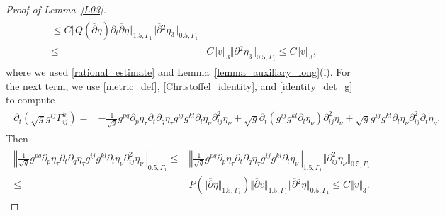 \documentclass[10pt,reqno]{amsart}
\theoremstyle{plain}
\theoremstyle{definition}
\numberwithin{equation}{section}
\newcommand{\ccP}{\mathscr{P}}
\newcommand{\Ga}{\Gamma}
\newcommand{\norm}[1]{\Vert#1\Vert}
\newcommand{\nnorm}[1]{\left\Vert#1\right\Vert}
\begin{document}
{\begin{proof}[Proof of Lemma~\ref{L03}]
\begin{align}
\begin{split}
\leq
C \norm{ Q(\overline{\partial} \eta ) \partial_t \overline{\partial} \eta}_{1.5,\Ga_1} \norm{\overline{\partial}{}^2 \eta_3}_{0.5,\Ga_1} 
\\\leq & 
C\norm{v}_3 \norm{\overline{\partial}{}^2 \eta_3}_{0.5,\Ga_1} 
\leq
C\norm{v}_3 ,
\end{split}
\nonumber
\end{align}
where we used \eqref{rational_estimate}
and Lemma~\ref{lemma_auxiliary_long}(i).
For the next term, we use  \eqref{metric_def}, \eqref{Christoffel_identity}, and  \eqref{identity_det_g} to compute
\begin{align}
\begin{split}
\partial_t (\sqrt{g} g^{ij}  \Ga_{ij}^k ) = &
-\frac{1}{\sqrt{g}} g^{pq} \partial_p \eta_\tau \partial_t \partial_q \eta_\tau g^{ij} g^{kl} \partial_l \eta_\nu \partial^2_{ij} \eta_\nu
+ \sqrt{g} \partial_t( g^{ij} g^{kl} \partial_l \eta_\nu ) \partial^2_{ij} \eta_\nu 
+
\sqrt{g} g^{ij} g^{kl} \partial_l \eta_\nu \partial^2_{ij} \partial_t \eta_\nu.
\end{split}
\nonumber
\end{align}
Then
\begin{align}
\begin{split}
\nnorm{ \frac{1}{\sqrt{g}} g^{pq} \partial_p \eta_\tau \partial_t \partial_q \eta_\tau g^{ij} g^{kl} \partial_l \eta_\nu \partial^2_{ij} \eta_\nu}_{0.5,\Ga_1}
\leq 
&
\nnorm{ \frac{1}{\sqrt{g}} g^{pq} \partial_p \eta_\tau \partial_t \partial_q \eta_\tau g^{ij} g^{kl} \partial_l \eta_\nu}_{1.5,\Ga_1} 
\norm{ \partial^2_{ij} \eta_\nu}_{0.5,\Ga_1}
\\
\leq & P(\norm{\overline{\partial} \eta}_{1.5,\Ga_1} ) \norm{\overline{\partial} v}_{1.5,\Ga_1} \norm{\overline{\partial}{}^2 \eta}_{0.5,\Ga_1}
\leq 
C \norm{v}_3.
\end{split}
\nonumber
\end{align}

\end{proof}}
\end{document}
